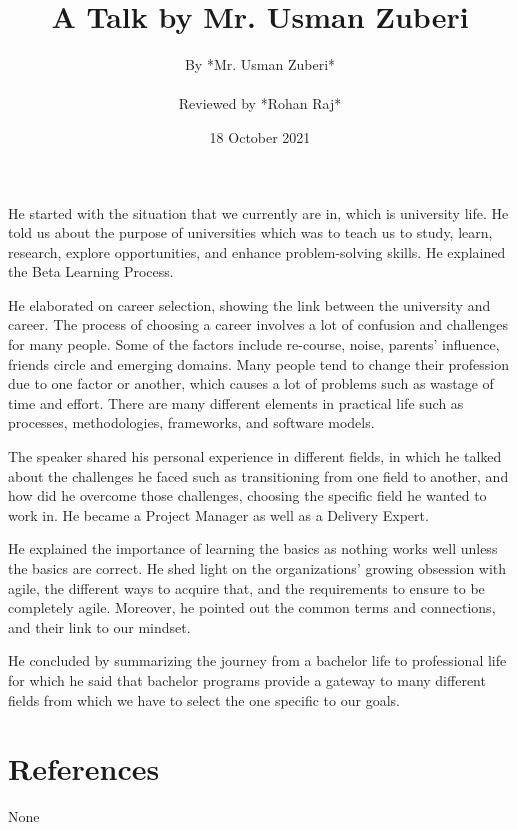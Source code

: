 \documentclass{article}
\title{A Talk by Mr. Usman Zuberi} %
\author{By *Mr. Usman Zuberi* \\ \\ Reviewed by *Rohan Raj*} %
\date{18 October 2021} %
\begin{document}
\maketitle
He started with the situation that we currently are in, which is university life. He told us about the purpose of universities which was to teach us to study, learn, research, explore opportunities, and enhance problem-solving skills. He explained the Beta Learning Process. 
\par
He elaborated on career selection, showing the link between the university and career. The process of choosing a career involves a lot of confusion and challenges for many people. Some of the factors include re-course, noise, parents’ influence, friends circle and emerging domains. Many people tend to change their profession due to one factor or another, which causes a lot of problems such as wastage of time and effort. There are many different elements in practical life such as processes, methodologies, frameworks, and software models.
\par
The speaker shared his personal experience in different fields, in which he talked about the challenges he faced such as transitioning from one field to another, and how did he overcome those challenges, choosing the specific field he wanted to work in. He became a Project Manager as well as a Delivery Expert. 
\par
He explained the importance of learning the basics as nothing works well unless the basics are correct. He shed light on the organizations’ growing obsession with agile, the different ways to acquire that, and the requirements to ensure to be completely agile. Moreover, he pointed out the common terms and connections, and their link to our mindset. 
\par
He concluded by summarizing the journey from a bachelor life to professional life for which he said that bachelor programs provide a gateway to many different fields from which we have to select the one specific to our goals.

\section*{References}
None 
\end{document}
